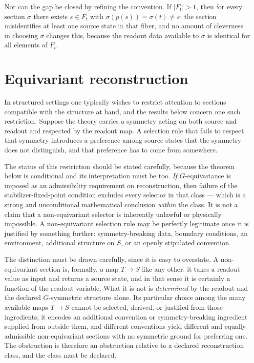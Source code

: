 \documentclass[11pt,reqno]{amsart}
\theoremstyle{plain}
\theoremstyle{definition}
\theoremstyle{remark}
\begin{document}
Nor can the gap be closed by refining the convention. If $|F_{t}|>1$, then for every section $\sigma$ there exists $s\in F_{t}$ with $\sigma(p(s))=\sigma(t)\neq s$: the section misidentifies at least one source state in that fiber, and no amount of cleverness in choosing $\sigma$ changes this, because the readout data available to $\sigma$ is identical for all elements of $F_{t}$.

\section{Equivariant reconstruction}
\label{sec:equivariant}

In structured settings one typically wishes to restrict attention to sections compatible with the structure at hand, and the results below concern one such restriction. Suppose the theory carries a symmetry acting on both source and readout and respected by the readout map. A selection rule that fails to respect that symmetry introduces a preference among source states that the symmetry does not distinguish, and that preference has to come from somewhere.

The status of this restriction should be stated carefully, because the theorem below is conditional and its interpretation must be too. \emph{If} $G$-equivariance is imposed as an admissibility requirement on reconstruction, then failure of the stabilizer-fixed-point condition excludes every selector in that class --- which is a strong and unconditional mathematical conclusion \emph{within} the class. It is not a claim that a non-equivariant selector is inherently unlawful or physically impossible. A non-equivariant selection rule may be perfectly legitimate once it is justified by something further: symmetry-breaking data, boundary conditions, an environment, additional structure on $S$, or an openly stipulated convention.

The distinction must be drawn carefully, since it is easy to overstate. A non-equivariant section is, formally, a map $T\to S$ like any other: it takes a readout value as input and returns a source state, and in that sense it is certainly a function of the readout variable. What it is not is \emph{determined} by the readout and the declared $G$-symmetric structure alone. Its particular choice among the many available maps $T\to S$ cannot be selected, derived, or justified from those ingredients; it encodes an additional convention or symmetry-breaking ingredient supplied from outside them, and different conventions yield different and equally admissible non-equivariant sections with no symmetric ground for preferring one. The obstruction is therefore an obstruction relative to a declared reconstruction class, and the class must be declared.
\end{document}
